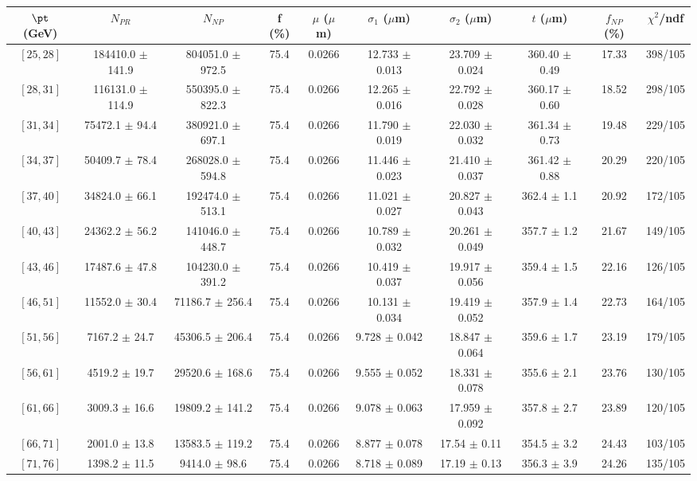 \begin{tabular}{c||c|c|c|c|c|c|c||c|c}
$\pt$ (GeV) & $N_{PR}$ & $N_{NP}$ & f (\%) & $\mu$ ($\mu$m) & $\sigma_1$ ($\mu$m) & $\sigma_2$ ($\mu$m)  & $t$ ($\mu$m) & $f_{NP}$ (\%) & $\chi^2$/ndf \\
\hline
$[25, 28]$ & 184410.0 $\pm$ 141.9 & 804051.0 $\pm$ 972.5 & 75.4 & 0.0266 & 12.733 $\pm$ 0.013 & 23.709 $\pm$ 0.024 & 360.40 $\pm$ 0.49 & 17.33 & 398/105\\
$[28, 31]$ & 116131.0 $\pm$ 114.9 & 550395.0 $\pm$ 822.3 & 75.4 & 0.0266 & 12.265 $\pm$ 0.016 & 22.792 $\pm$ 0.028 & 360.17 $\pm$ 0.60 & 18.52 & 298/105\\
$[31, 34]$ & 75472.1 $\pm$ 94.4 & 380921.0 $\pm$ 697.1 & 75.4 & 0.0266 & 11.790 $\pm$ 0.019 & 22.030 $\pm$ 0.032 & 361.34 $\pm$ 0.73 & 19.48 & 229/105\\
$[34, 37]$ & 50409.7 $\pm$ 78.4 & 268028.0 $\pm$ 594.8 & 75.4 & 0.0266 & 11.446 $\pm$ 0.023 & 21.410 $\pm$ 0.037 & 361.42 $\pm$ 0.88 & 20.29 & 220/105\\
$[37, 40]$ & 34824.0 $\pm$ 66.1 & 192474.0 $\pm$ 513.1 & 75.4 & 0.0266 & 11.021 $\pm$ 0.027 & 20.827 $\pm$ 0.043 & 362.4 $\pm$ 1.1 & 20.92 & 172/105\\
$[40, 43]$ & 24362.2 $\pm$ 56.2 & 141046.0 $\pm$ 448.7 & 75.4 & 0.0266 & 10.789 $\pm$ 0.032 & 20.261 $\pm$ 0.049 & 357.7 $\pm$ 1.2 & 21.67 & 149/105\\
$[43, 46]$ & 17487.6 $\pm$ 47.8 & 104230.0 $\pm$ 391.2 & 75.4 & 0.0266 & 10.419 $\pm$ 0.037 & 19.917 $\pm$ 0.056 & 359.4 $\pm$ 1.5 & 22.16 & 126/105\\
$[46, 51]$ & 11552.0 $\pm$ 30.4 & 71186.7 $\pm$ 256.4 & 75.4 & 0.0266 & 10.131 $\pm$ 0.034 & 19.419 $\pm$ 0.052 & 357.9 $\pm$ 1.4 & 22.73 & 164/105\\
$[51, 56]$ & 7167.2 $\pm$ 24.7 & 45306.5 $\pm$ 206.4 & 75.4 & 0.0266 & 9.728 $\pm$ 0.042 & 18.847 $\pm$ 0.064 & 359.6 $\pm$ 1.7 & 23.19 & 179/105\\
$[56, 61]$ & 4519.2 $\pm$ 19.7 & 29520.6 $\pm$ 168.6 & 75.4 & 0.0266 & 9.555 $\pm$ 0.052 & 18.331 $\pm$ 0.078 & 355.6 $\pm$ 2.1 & 23.76 & 130/105\\
$[61, 66]$ & 3009.3 $\pm$ 16.6 & 19809.2 $\pm$ 141.2 & 75.4 & 0.0266 & 9.078 $\pm$ 0.063 & 17.959 $\pm$ 0.092 & 357.8 $\pm$ 2.7 & 23.89 & 120/105\\
$[66, 71]$ & 2001.0 $\pm$ 13.8 & 13583.5 $\pm$ 119.2 & 75.4 & 0.0266 & 8.877 $\pm$ 0.078 & 17.54 $\pm$ 0.11 & 354.5 $\pm$ 3.2 & 24.43 & 103/105\\
$[71, 76]$ & 1398.2 $\pm$ 11.5 & 9414.0 $\pm$ 98.6 & 75.4 & 0.0266 & 8.718 $\pm$ 0.089 & 17.19 $\pm$ 0.13 & 356.3 $\pm$ 3.9 & 24.26 & 135/105\\

\end{tabular}
